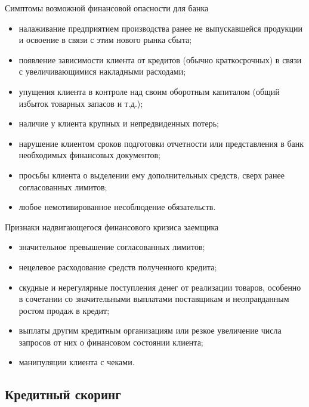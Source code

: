 \documentclass[_Banking_p2.tex]{subfiles}
\begin{document}
\begin{frame}[ allowframebreaks ]{Симптомы возможной финансовой опасности для банка }
\begin{itemize}
\item
налаживание предприятием производства ранее не выпускавшейся продукции и освоение в связи с этим нового рынка сбыта;
\item
появление зависимости клиента от кредитов (обычно краткосрочных) в связи с увеличивающимися накладными расходами;
\item
упущения клиента в контроле над своим оборотным капиталом (общий избыток товарных запасов и т.д.);

\pagebreak
\item
наличие у клиента крупных и непредвиденных потерь;
\item
нарушение клиентом сроков подготовки отчетности или представления в банк необходимых финансовых документов;
\item
просьбы клиента о выделении ему дополнительных средств, сверх ранее согласованных лимитов;
\item
любое немотивированное несоблюдение обязательств.
\end{itemize}
\end{frame}

\begin{frame}[ allowframebreaks ]{Признаки надвигающегося финансового кризиса заемщика}
\begin{itemize}
\item
значительное превышение согласованных лимитов;
\item
нецелевое расходование средств полученного кредита;
\item
скудные и нерегулярные поступления денег от реализации товаров, особенно в сочетании со значительными выплатами поставщикам и неоправданным ростом продаж в кредит;

\pagebreak
\item
выплаты другим кредитным организациям или резкое увеличение числа запросов от них о финансовом состоянии клиента;
\item
манипуляции клиента с чеками.
\end{itemize}
\end{frame}

\subsection{Кредитный скоринг}
\end{document}
